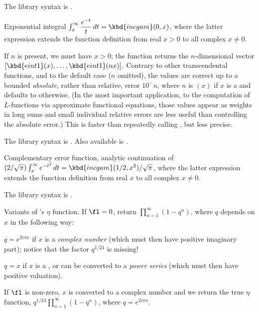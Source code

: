 The library syntax is .

\label{se:eint1}
Exponential integral $\int_x^\infty \dfrac{e^{-t}}{t}\,dt =
\kbd{incgam}(0, x)$, where the latter expression extends the function
definition from real $x > 0$ to all complex $x \neq 0$.

If $n$ is present, we must have $x > 0$; the function returns the
$n$-dimensional vector $[\kbd{eint1}(x),\dots,\kbd{eint1}(nx)]$. Contrary to
other transcendental functions, and to the default case ($n$ omitted), the
values are correct up to a bounded \emph{absolute}, rather than relative,
error $10^-n$, where $n$ is $(x)$ if $x$ is a 
and defaults to  otherwise. (In the most important
application, to the computation of $L$-functions via approximate functional
equations, those values appear as weights in long sums and small individual
relative errors are less useful than controlling the absolute error.) This is
faster than repeatedly calling , but less precise.

The library syntax is .
Also available is .

\label{se:erfc}
Complementary error function, analytic continuation of
$(2/\sqrt\pi)\int_x^\infty e^{-t^2}\,dt = \kbd{incgam}(1/2,x^2)/\sqrt\pi$,
where the latter expression extends the function definition from real $x$ to
all complex $x \neq 0$.

The library syntax is .

\label{se:eta}
Variants of 's $\eta$ function.
If $\fl = 0$, return $\prod_{n=1}^\infty(1-q^n)$, where $q$ depends on $x$
in the following way:

\item $q = e^{2i\pi x}$ if $x$ is a \emph{complex number} (which must then
have positive imaginary part); notice that the factor $q^{1/24}$ is
missing!

\item $q = x$ if $x$ is a , or can be converted to a
\emph{power series} (which must then have positive valuation).

If $\fl$ is non-zero, $x$ is converted to a complex number and we return the
true $\eta$ function, $q^{1/24}\prod_{n=1}^\infty(1-q^n)$,
where $q = e^{2i\pi x}$.

